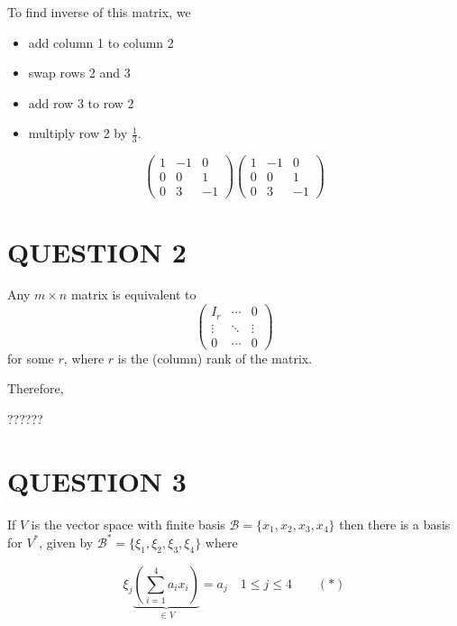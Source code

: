 \documentclass[a4paper]{article}
\begin{document}
To find inverse of this matrix, we

\begin{itemize}
	\item add column 1 to column 2
	\item swap rows 2 and 3
	\item add row 3 to row 2
	\item multiply row 2 by $ \frac{1}{3} $.
\end{itemize}

\[ \begin{pmatrix}
1 & -1 & 0\\
0 & 0 & 1 \\
0 & 3 & -1
\end{pmatrix}
\begin{pmatrix}
1 & -1 & 0\\
0 & 0 & 1 \\
0 & 3 & -1
\end{pmatrix}
\]


\section{QUESTION 2}

\begin{thm} Any $ m \times n $ matrix is equivalent to \[ \begin{pmatrix}
	I_{r} & \cdots & 0 \\
	\vdots & \ddots & \vdots \\
	0 & \cdots & 0  \end{pmatrix} \]  for some $ r $, where $ r $ is the (column) rank of the matrix. 
	
\end{thm}

Therefore,

??????


\section{QUESTION 3}

If $ V $ is the vector space with finite basis $\mathcal{B} =  \{ x_{1},x_{2},x_{3},x_{4} \} $ then there is a basis for $ V^{*} $, given by $ \mathcal{B}^{*} = \{  \xi_{1},\xi_{2},\xi_{3},\xi_{4} \} $ where

\[ \xi_{j}  \underbrace{\left(  \sum_{i=1}^{4} a_{i}x_{i} \right)}_{\in V} = a_{j} \quad 1 \leq j \leq 4 \qquad (*) \]
\end{document}

